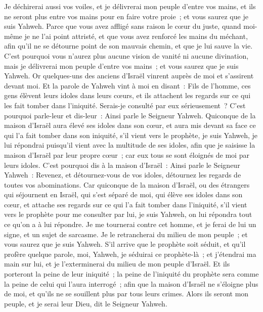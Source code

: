 \begin{multicols}{2}
Je déchirerai aussi vos voiles, et je délivrerai mon peuple d'entre vos mains, et ils ne seront plus entre vos mains pour en faire votre proie~; et vous saurez que je suis Yahweh.
Parce que vous avez affligé sans raison le cœur du juste, quand moi-même je ne l'ai point attristé, et que vous avez renforcé les mains du méchant, afin qu'il ne se détourne point de son mauvais chemin, et que je lui sauve la vie.
C'est pourquoi vous n'aurez plus aucune vision de vanité ni aucune divination, mais je délivrerai mon peuple d'entre vos mains~; et vous saurez que je suis Yahweh.
\VerseOne{}Or quelques-uns des anciens d'Israël vinrent auprès de moi et s'assirent devant moi.
Et la parole de Yahweh vint à moi en disant~:
Fils de l'homme, ces gens élèvent leurs idoles dans leurs cœurs, et ils attachent les regards sur ce qui les fait tomber dans l'iniquité. Serais-je consulté par eux sérieusement~?
C'est pourquoi parle-leur et dis-leur~: Ainsi parle le Seigneur Yahweh. Quiconque de la maison d'Israël aura élevé ses idoles dans son cœur, et aura mis devant sa face ce qui l'a fait tomber dans son iniquité, s'il vient vers le prophète, je suis Yahweh, je lui répondrai puisqu'il vient avec la multitude de ses idoles,
afin que je saisisse la maison d'Israël par leur propre cœur~; car eux tous se sont éloignés de moi par leurs idoles.
C'est pourquoi dis à la maison d'Israël~: Ainsi parle le Seigneur Yahweh~: Revenez, et détournez-vous de vos idoles, détournez les regards de toutes vos abominations.
Car quiconque de la maison d'Israël, ou des étrangers qui séjournent en Israël, qui s'est séparé de moi, qui élève ses idoles dans son cœur, et attache ses regards sur ce qui l'a fait tomber dans l'iniquité, s'il vient vers le prophète pour me consulter par lui, je suis Yahweh, on lui répondra tout ce qu'on a à lui répondre.
Je me tournerai contre cet homme, et je ferai de lui un signe, et un sujet de sarcasme. Je le retrancherai du milieu de mon peuple~; et vous saurez que je suis Yahweh.
S'il arrive que le prophète soit séduit, et qu'il profère quelque parole, moi, Yahweh, je séduirai ce prophète-là~; et j'étendrai ma main sur lui, et je l'exterminerai du milieu de mon peuple d'Israël.
Et ils porteront la peine de leur iniquité~; la peine de l'iniquité du prophète sera comme la peine de celui qui l'aura interrogé~;
afin que la maison d'Israël ne s'éloigne plus de moi, et qu'ils ne se souillent plus par tous leurs crimes. Alors ils seront mon peuple, et je serai leur Dieu, dit le Seigneur Yahweh.

\end{multicols}
